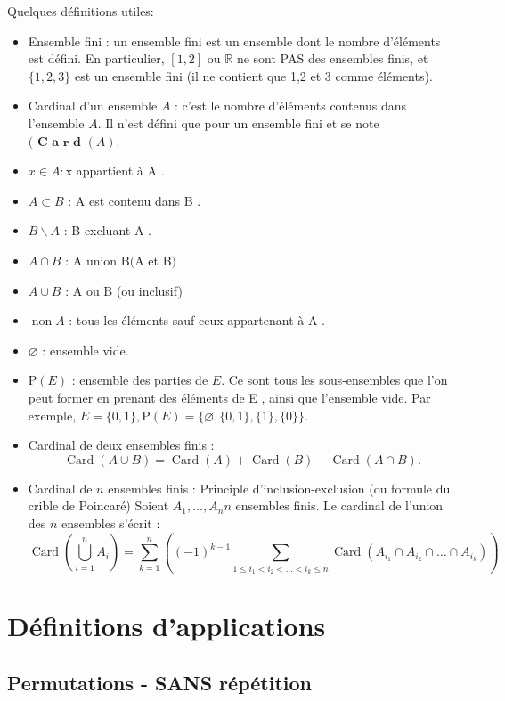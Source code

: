 Quelques définitions utiles:
\begin{itemize}
    \item Ensemble fini : un ensemble fini est un ensemble dont le nombre d'éléments est défini. En particulier, \([1,2]\) ou \(\mathbb{R}\) ne sont PAS des ensembles finis, et \(\{1,2,3\}\) est un ensemble fini (il ne contient que 1,2 et 3 comme éléments).
    \item Cardinal d'un ensemble $A$ : c'est le nombre d'éléments contenus dans l'ensemble $A$. Il n'est défini que pour un ensemble fini et se note $(\boldsymbol{\text{ C a r d }}(A)$.
    \item \(x \in A: \mathrm{x}\) appartient à A .
    \item \(A \subset B\) : A est contenu dans B .
    \item \(B \backslash A\) : B excluant A .
    \item \(A \cap B\) : A union \(\mathrm{B}(\mathrm{A}\) et B\()\)
    \item \(A \cup B\) : A ou B (ou inclusif)
    \item \(\operatorname{non} A\) : tous les éléments sauf ceux appartenant à A .
    \item \(\varnothing\) : ensemble vide.
    \item \(\mathrm{P}(E)\) : ensemble des parties de \(E\). Ce sont tous les sous-ensembles que l'on peut former en prenant des éléments de E , ainsi que l'ensemble vide. Par exemple, \(E=\{0,1\}, \mathrm{P}(E)= \{\varnothing,\{0,1\},\{1\},\{0\}\}\).
    \item Cardinal de deux ensembles finis :
    \[
    \operatorname{Card}(A \cup B)=\operatorname{Card}(A)+\operatorname{Card}(B)-\operatorname{Card}(A \cap B) .
    \]
    \item Cardinal de \(n\) ensembles finis : Principle d'inclusion-exclusion (ou formule du crible de Poincaré)
    Soient \(A_{1}, \ldots, A_{n} n\) ensembles finis. Le cardinal de l'union des \(n\) ensembles s'écrit :
    \[
    \operatorname{Card}\left(\bigcup_{i=1}^{n} A_{i}\right)=\sum_{k=1}^{n}\left((-1)^{k-1} \sum_{1 \leq i_{1}<i_{2}<\ldots<i_{k} \leq n} \operatorname{Card}\left(A_{i_{1}} \cap A_{i_{2}} \cap \ldots \cap A_{i_{k}}\right)\right)
    \]
\end{itemize}


\section{Définitions d'applications}
\subsection{Permutations - SANS répétition}

